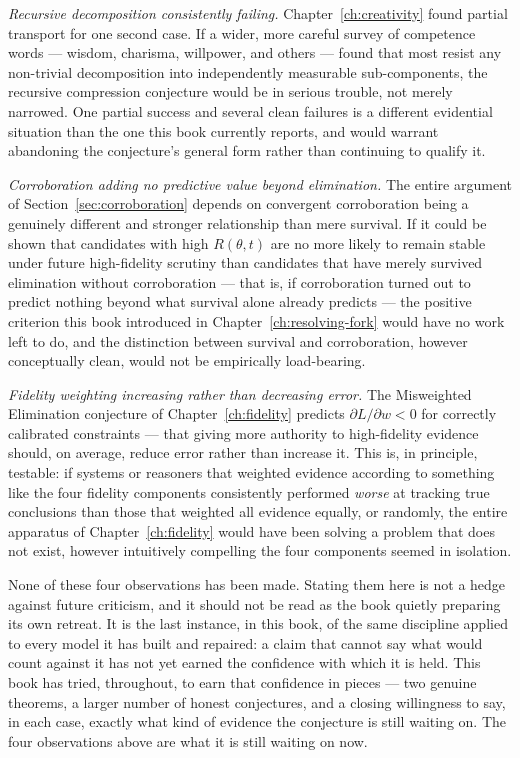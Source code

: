 \emph{Recursive decomposition consistently failing.} Chapter~\ref{ch:creativity} found partial transport for one second case. If a wider, more careful survey of competence words --- wisdom, charisma, willpower, and others --- found that most resist any non-trivial decomposition into independently measurable sub-components, the recursive compression conjecture would be in serious trouble, not merely narrowed. One partial success and several clean failures is a different evidential situation than the one this book currently reports, and would warrant abandoning the conjecture's general form rather than continuing to qualify it.

\emph{Corroboration adding no predictive value beyond elimination.} The entire argument of Section~\ref{sec:corroboration} depends on convergent corroboration being a genuinely different and stronger relationship than mere survival. If it could be shown that candidates with high $R(\theta,t)$ are no more likely to remain stable under future high-fidelity scrutiny than candidates that have merely survived elimination without corroboration --- that is, if corroboration turned out to predict nothing beyond what survival alone already predicts --- the positive criterion this book introduced in Chapter~\ref{ch:resolving-fork} would have no work left to do, and the distinction between survival and corroboration, however conceptually clean, would not be empirically load-bearing.

\emph{Fidelity weighting increasing rather than decreasing error.} The Misweighted Elimination conjecture of Chapter~\ref{ch:fidelity} predicts $\partial L/\partial w < 0$ for correctly calibrated constraints --- that giving more authority to high-fidelity evidence should, on average, reduce error rather than increase it. This is, in principle, testable: if systems or reasoners that weighted evidence according to something like the four fidelity components consistently performed \emph{worse} at tracking true conclusions than those that weighted all evidence equally, or randomly, the entire apparatus of Chapter~\ref{ch:fidelity} would have been solving a problem that does not exist, however intuitively compelling the four components seemed in isolation.

None of these four observations has been made. Stating them here is not a hedge against future criticism, and it should not be read as the book quietly preparing its own retreat. It is the last instance, in this book, of the same discipline applied to every model it has built and repaired: a claim that cannot say what would count against it has not yet earned the confidence with which it is held. This book has tried, throughout, to earn that confidence in pieces --- two genuine theorems, a larger number of honest conjectures, and a closing willingness to say, in each case, exactly what kind of evidence the conjecture is still waiting on. The four observations above are what it is still waiting on now.

